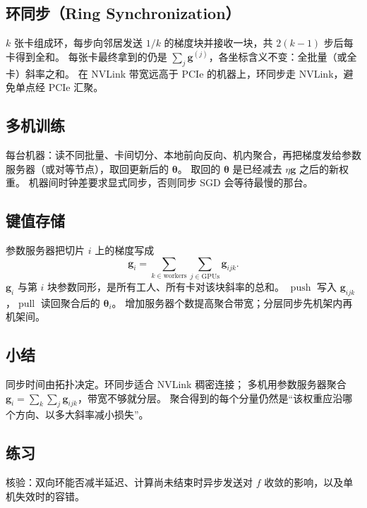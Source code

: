 \subsection{环同步（Ring Synchronization）}

$k$ 张卡组成环，每步向邻居发送 $1/k$ 的梯度块并接收一块，共 $2(k-1)$ 步后每卡得到全和。
每张卡最终拿到的仍是 $\sum_j\bm{g}^{(j)}$，各坐标含义不变：全批量（或全卡）斜率之和。
在 NVLink 带宽远高于 PCIe 的机器上，环同步走 NVLink，避免单点经 PCIe 汇聚。

\subsection{多机训练}

每台机器：读不同批量、卡间切分、本地前向反向、机内聚合，再把梯度发给参数服务器（或对等节点），取回更新后的 $\bm{\theta}$。
取回的 $\bm{\theta}$ 是已经减去 $\eta\bm{g}$ 之后的新权重。
机器间时钟差要求显式同步，否则同步 SGD 会等待最慢的那台。

\subsection{键值存储}

参数服务器把切片 $i$ 上的梯度写成
\[
\bm{g}_{i}
=
\sum_{k\in\mathrm{workers}}
\sum_{j\in\mathrm{GPUs}}
\bm{g}_{ijk}.
\]
$\bm{g}_i$ 与第 $i$ 块参数同形，是所有工人、所有卡对该块斜率的总和。
$\operatorname{push}$ 写入 $\bm{g}_{ijk}$，$\operatorname{pull}$ 读回聚合后的 $\bm{\theta}_i$。
增加服务器个数提高聚合带宽；分层同步先机架内再机架间。

\subsection{小结}

同步时间由拓扑决定。环同步适合 NVLink 稠密连接；
多机用参数服务器聚合 $\bm{g}_i=\sum_k\sum_j\bm{g}_{ijk}$，带宽不够就分层。
聚合得到的每个分量仍然是“该权重应沿哪个方向、以多大斜率减小损失”。

\subsection{练习}

核验：双向环能否减半延迟、计算尚未结束时异步发送对 $f$ 收敛的影响，以及单机失效时的容错。
